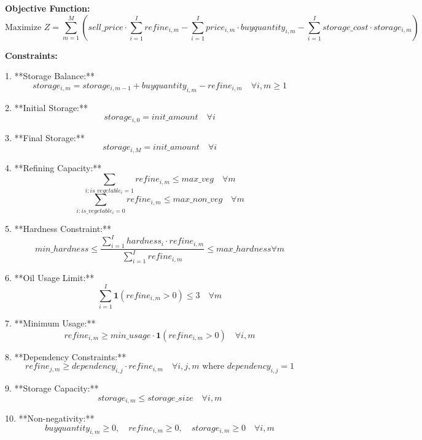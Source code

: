 \documentclass{article}
\begin{document}
\textbf{Objective Function:}
\[
\text{Maximize } Z = \sum_{m=1}^{M} \left( sell\_price \cdot \sum_{i=1}^{I} refine_{i,m} - \sum_{i=1}^{I} price_{i,m} \cdot buyquantity_{i,m} - \sum_{i=1}^{I} storage\_cost \cdot storage_{i,m} \right)
\]

\textbf{Constraints:}

1. **Storage Balance:**
\[
storage_{i,m} = storage_{i,m-1} + buyquantity_{i,m} - refine_{i,m} \quad \forall i, m \geq 1
\]

2. **Initial Storage:**
\[
storage_{i,0} = init\_amount \quad \forall i
\]

3. **Final Storage:**
\[
storage_{i,M} = init\_amount \quad \forall i
\]

4. **Refining Capacity:**
\[
\sum_{i: is\_vegetable_{i}=1} refine_{i,m} \leq max\_veg \quad \forall m
\]
\[
\sum_{i: is\_vegetable_{i}=0} refine_{i,m} \leq max\_non\_veg \quad \forall m
\]

5. **Hardness Constraint:**
\[
min\_hardness \leq \frac{\sum_{i=1}^{I} hardness_{i} \cdot refine_{i,m}}{\sum_{i=1}^{I} refine_{i,m}} \leq max\_hardness \forall m
\]

6. **Oil Usage Limit:**
\[
\sum_{i=1}^{I} \textbf{1}(refine_{i,m} > 0) \leq 3 \quad \forall m
\]

7. **Minimum Usage:**
\[
refine_{i,m} \geq min\_usage \cdot \textbf{1}(refine_{i,m} > 0) \quad \forall i, m
\]

8. **Dependency Constraints:**
\[
refine_{j,m} \geq dependency_{i,j} \cdot refine_{i,m} \quad \forall i,j, m \text{ where } dependency_{i,j} = 1
\]

9. **Storage Capacity:**
\[
storage_{i,m} \leq storage\_size \quad \forall i, m
\]

10. **Non-negativity:**
\[
buyquantity_{i,m} \geq 0, \quad refine_{i,m} \geq 0, \quad storage_{i,m} \geq 0 \quad \forall i, m
\]
\end{document}
